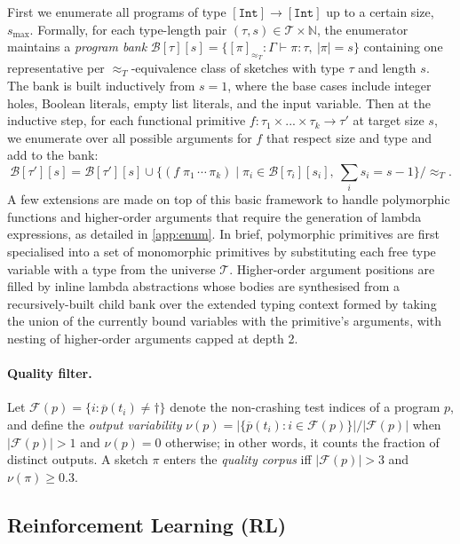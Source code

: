 \documentclass[12pt]{article}
\begin{document}
First we enumerate all programs of type $[\texttt{Int}] \to [\texttt{Int}]$ up to a certain size, $s_{\max}$. Formally, for each type-length pair $(\tau, s) \in \mathcal{T} \times \mathbb{N}$, the enumerator maintains a \emph{program bank} $\mathcal{B}[\tau][s] = \{[\pi]_{\approx_T} : \Gamma \vdash \pi : \tau,\ |\pi| = s\}$ containing one representative per $\approx_T$-equivalence class of sketches with type $\tau$ and length $s$. The bank is built inductively from $s = 1$, where the base cases include integer holes, Boolean literals, empty list literals, and the input variable. Then at the inductive step, for each functional primitive $f : \tau_1 \times ... \times \tau_k \to \tau'$ at target size $s$, we enumerate over all possible arguments for $f$ that respect size and type and add to the bank:
\begin{equation}
  \mathcal{B}[\tau'][s] = \mathcal{B}[\tau'][s] \cup \Big\{(f\;\pi_1\,\cdots\,\pi_k) \;\Big|\; \pi_i \in \mathcal{B}[\tau_i][s_i],\ \textstyle\sum_i s_i = s - 1\Big\}\!\Big/\!\approx_T.
  \label{eq:enum-apply}
\end{equation}
A few extensions are made on top of this basic framework to handle polymorphic functions and higher-order arguments that require the generation of lambda expressions, as detailed in \cref{app:enum}. In brief, polymorphic primitives are first specialised into a set of monomorphic primitives by substituting each free type variable with a type from the universe $\mathcal{T}$. Higher-order argument positions are filled by inline lambda abstractions whose bodies are synthesised from a recursively-built child bank over the extended typing context formed by taking the union of the currently bound variables with the primitive's arguments, with nesting of higher-order arguments capped at depth 2. 

\paragraph{Quality filter.} Let $\mathcal{F}(p) = \{i : \overline{p}(t_i) \neq \dagger\}$ denote the non-crashing test indices of a program $p$, and define the \emph{output variability} $\nu(p) = |\{\overline{p}(t_i) : i \in \mathcal{F}(p)\}| / |\mathcal{F}(p)|$ when $|\mathcal{F}(p)| > 1$ and $\nu(p) = 0$ otherwise; in other words, it counts the fraction of distinct outputs. A sketch $\pi$ enters the \emph{quality corpus} iff $|\mathcal{F}(p)| > 3$ and $\nu(\pi) \geq 0.3$.

\subsection{Reinforcement Learning (RL)}
\label{sec:dataset-rl}
\end{document}
